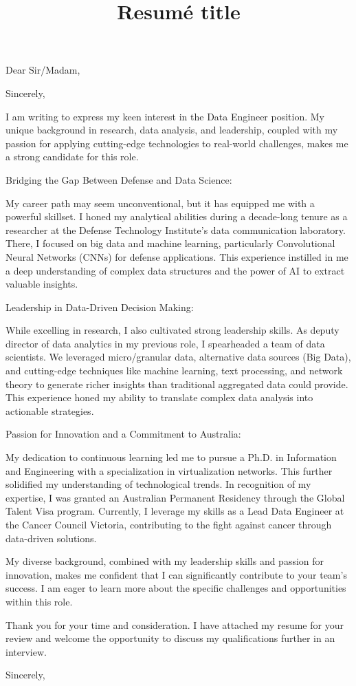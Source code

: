 \documentclass[11pt,a4paper,roman]{moderncv}        %
\title{Resumé title}                               %
\begin{document}
\recipient{}{}
\opening{Dear Sir/Madam,}
\closing{Sincerely,}
\makelettertitle

I am writing to express my keen interest in the Data Engineer position. My unique background in research, data analysis, and leadership, coupled with my passion for applying cutting-edge technologies to real-world challenges, makes me a strong candidate for this role.

Bridging the Gap Between Defense and Data Science:

My career path may seem unconventional, but it has equipped me with a powerful skillset. I honed my analytical abilities during a decade-long tenure as a researcher at the Defense Technology Institute's data communication laboratory. There, I focused on big data and machine learning, particularly Convolutional Neural Networks (CNNs) for defense applications. This experience instilled in me a deep understanding of complex data structures and the power of AI to extract valuable insights.

Leadership in Data-Driven Decision Making:

While excelling in research, I also cultivated strong leadership skills. As deputy director of data analytics in my previous role, I spearheaded a team of data scientists. We leveraged micro/granular data, alternative data sources (Big Data), and cutting-edge techniques like machine learning, text processing, and network theory to generate richer insights than traditional aggregated data could provide. This experience honed my ability to translate complex data analysis into actionable strategies.

Passion for Innovation and a Commitment to Australia:

My dedication to continuous learning led me to pursue a Ph.D. in Information and Engineering with a specialization in virtualization networks. This further solidified my understanding of technological trends. In recognition of my expertise, I was granted an Australian Permanent Residency through the Global Talent Visa program. Currently, I leverage my skills as a Lead Data Engineer at the Cancer Council Victoria, contributing to the fight against cancer through data-driven solutions.

My diverse background, combined with my leadership skills and passion for innovation, makes me confident that I can significantly contribute to your team's success. I am eager to learn more about the specific challenges and opportunities within this role.

Thank you for your time and consideration. I have attached my resume for your review and welcome the opportunity to discuss my qualifications further in an interview.

Sincerely,

\vspace{0.5cm}


\makeletterclosing
\end{document}
